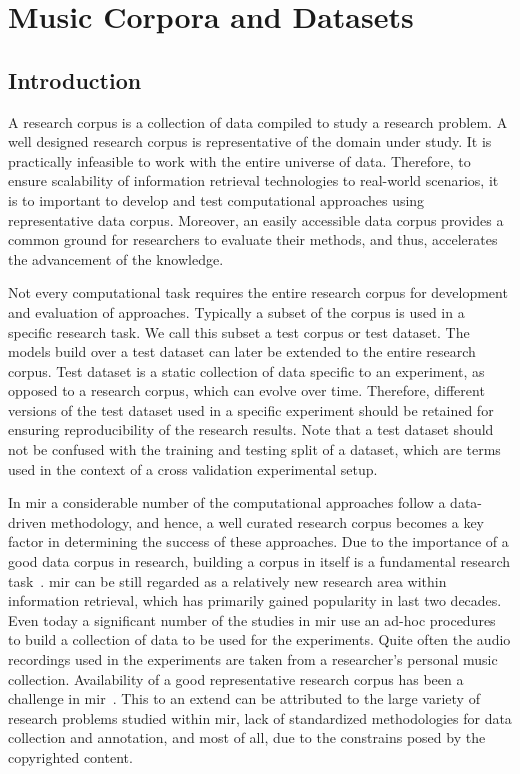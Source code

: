 
\chapter{Music Corpora and Datasets}
\label{chap:corpus_music_corpora_and_datasets}


\section{Introduction}
\label{sec:corpus_intro}

A research corpus is a collection of data compiled to study a research problem. A well designed research corpus is representative of the domain under study. It is practically infeasible to work with the entire universe of data. Therefore, to ensure scalability of information retrieval technologies to real-world scenarios, it is to important to develop and test computational approaches using representative data corpus. Moreover, an easily accessible data corpus provides a common ground for researchers to evaluate their methods, and thus, accelerates the advancement of the knowledge. 

Not every computational task requires the entire research corpus for development and evaluation of approaches. Typically a subset of the corpus is used in a specific research task. We call this subset a test corpus or test dataset. The models build over a test dataset can later be extended to the entire research corpus. Test dataset is a static collection of data specific to an experiment, as opposed to a research corpus, which can evolve over time. Therefore, different versions of the test dataset used in a specific experiment should be retained for ensuring reproducibility of the research results. Note that a test dataset should not be confused with the training and testing split of a dataset, which are terms used in the context of a cross validation experimental setup.

In \gls{mir} a considerable number of the computational approaches follow a data-driven methodology, and hence, a well curated research corpus becomes a key factor in determining the success of these approaches. Due to the importance of a good data corpus in research, building a corpus in itself is a fundamental research task~\citep{macmullen2003requirements}. \Gls{mir} can be still regarded as a relatively new research area within information retrieval, which has primarily gained popularity in last two decades. Even today a significant number of the studies in \gls{mir} use an ad-hoc procedures to build a collection of data to be used for the experiments. Quite often the audio recordings used in the experiments are taken from a researcher's personal music collection. Availability of a good representative research corpus has been a challenge in \gls{mir}~\citep{serra:14:corpus}. This to an extend can be attributed to the large variety of research problems studied within \gls{mir}, lack of standardized methodologies for data collection and annotation, and most of all, due to the constrains posed by the copyrighted content.

